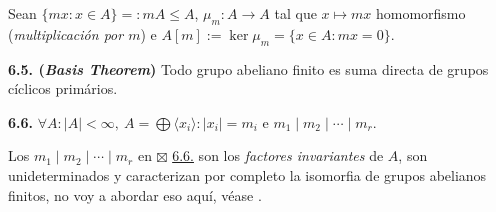 \begin{definition}
    Sean \(\{mx : x \in A \}=: mA \leq A\),  \(\mu_m :  A \to A\) tal que \( x \mapsto mx\) homomorfismo (\emph{multiplicación por $m$}) e \(A[m]:= \ker \mu_m = \{x \in A : mx = 0\}\). 
\end{definition}

\hypertarget{thm65}{}
\begin{theorem}
    \textbf{6.5. (\emph{Basis Theorem})} Todo grupo abeliano finito es suma directa de grupos cíclicos primários.  
\end{theorem}

\begin{corollary}
    \textbf{6.6.} \(\forall A : |A| < \infty, \ A = \bigoplus \langle x_i \rangle : |x_i| = m_i\) e \(m_1 \mid m_2 \mid \cdots \mid m_r\).
\end{corollary}


\begin{note}
    Los \(m_1 \mid m_2 \mid \cdots \mid m_r\) en {\scriptsize \(\boxtimes\)} \hyperlink{coro66}{6.6.} son los \emph{factores invariantes} de \(A\), son unideterminados y caracterizan por completo la isomorfia de grupos abelianos finitos, no voy a abordar eso aquí, véase \cite[pag. 132-133]{stein}. 
\end{note}



